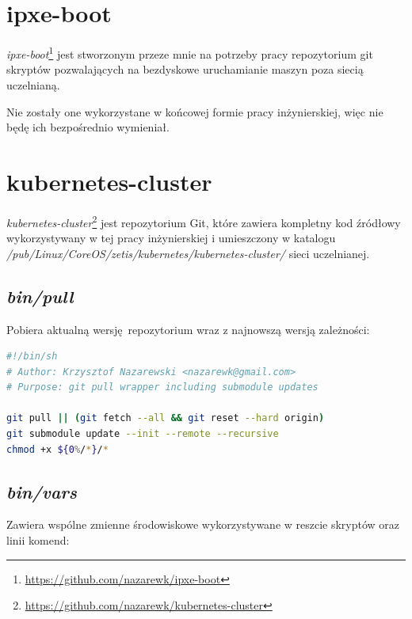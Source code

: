 \documentclass[a4paper,12pt,twoside,openany]{report}
\DeclareRobustCommand{\href}[2]{#2\footnote{\url{#1}}}
\begin{document}
\hypertarget{ipxe-boot}{%
\section{ipxe-boot}\label{ipxe-boot}}

\href{https://github.com/nazarewk/ipxe-boot}{\emph{ipxe-boot}} jest
stworzonym przeze mnie na potrzeby pracy repozytorium git skryptów
pozwalających na bezdyskowe uruchamianie maszyn poza siecią uczelnianą.

Nie zostały one wykorzystane w końcowej formie pracy inżynierskiej, więc
nie będę ich bezpośrednio wymieniał.

\hypertarget{kubernetes-cluster}{%
\section{kubernetes-cluster}\label{kubernetes-cluster}}

\href{https://github.com/nazarewk/kubernetes-cluster}{\emph{kubernetes-cluster}}
jest repozytorium Git, które zawiera kompletny kod źródłowy
wykorzystywany w tej pracy inżynierskiej i umieszczony w katalogu
\emph{/pub/Linux/CoreOS/zetis/kubernetes/kubernetes-cluster/} sieci
uczelnianej.

\newpage

\hypertarget{binpull}{%
\subsection{\texorpdfstring{\emph{bin/pull}}{bin/pull}}\label{binpull}}

Pobiera aktualną wersję~repozytorium wraz z najnowszą wersją zależności:

\begin{lstlisting}[language=bash]
#!/bin/sh
# Author: Krzysztof Nazarewski <nazarewk@gmail.com>
# Purpose: git pull wrapper including submodule updates

git pull || (git fetch --all && git reset --hard origin)
git submodule update --init --remote --recursive
chmod +x ${0%/*}/*
\end{lstlisting}

\hypertarget{binvars}{%
\subsection{\texorpdfstring{\emph{bin/vars}}{bin/vars}}\label{binvars}}

Zawiera wspólne zmienne środowiskowe wykorzystywane w reszcie skryptów
oraz linii komend:
\end{document}
